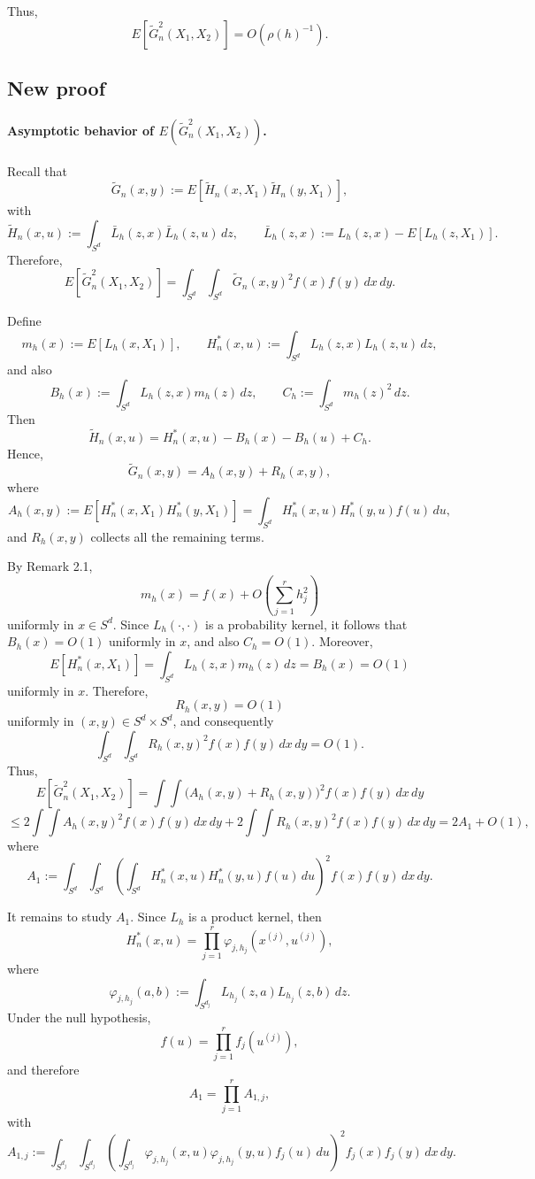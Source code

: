 \documentclass{article}
\begin{document}
Thus,
\[
E\!\left[\widetilde G_n^2(X_1,X_2)\right]=O(\rho(h)^{-1}).
\]

\subsection{New proof}

\paragraph{Asymptotic behavior of $E(\widetilde G_n^2(X_1,X_2))$.}
Recall that
\[
\widetilde G_n(x,y):=E\!\left[\widetilde H_n(x,X_1)\widetilde H_n(y,X_1)\right],
\]
with
\[
\widetilde H_n(x,u):=\int_{S^d}\bar{L}_h(z,x)\bar{L}_h(z,u)\,dz,
\qquad
\bar{L}_h(z,x):=L_h(z,x)-E[L_h(z,X_1)].
\]
Therefore,
\[
E\!\left[\widetilde G_n^2(X_1,X_2)\right]
=
\int_{S^d}\int_{S^d}\widetilde G_n(x,y)^2 f(x)f(y)\,dx\,dy.
\]

Define
\[
m_h(x):=E[L_h(x,X_1)],
\qquad
H_n^*(x,u):=\int_{S^d}L_h(z,x)L_h(z,u)\,dz,
\]
and also
\[
B_h(x):=\int_{S^d}L_h(z,x)m_h(z)\,dz,
\qquad
C_h:=\int_{S^d}m_h(z)^2\,dz.
\]
Then
\[
\widetilde H_n(x,u)=H_n^*(x,u)-B_h(x)-B_h(u)+C_h.
\]
Hence,
\[
\widetilde G_n(x,y)
=
A_h(x,y)+R_h(x,y),
\]
where
\[
A_h(x,y):=E\!\left[H_n^*(x,X_1)H_n^*(y,X_1)\right]
=
\int_{S^d}H_n^*(x,u)H_n^*(y,u)f(u)\,du,
\]
and $R_h(x,y)$ collects all the remaining terms.

By Remark 2.1,
\[
m_h(x)=f(x)+O\!\left(\sum_{j=1}^r h_j^2\right)
\]
uniformly in $x\in S^d$. Since $L_h(\cdot,\cdot)$ is a probability kernel, it follows that
$B_h(x)=O(1)$ uniformly in $x$, and also $C_h=O(1)$. Moreover,
\[
E\!\left[H_n^*(x,X_1)\right]
=
\int_{S^d}L_h(z,x)m_h(z)\,dz
=
B_h(x)
=
O(1)
\]
uniformly in $x$. Therefore,
\[
R_h(x,y)=O(1)
\]
uniformly in $(x,y)\in S^d\times S^d$, and consequently
\[
\int_{S^d}\int_{S^d}R_h(x,y)^2 f(x)f(y)\,dx\,dy=O(1).
\]
Thus,
\[
E\!\left[\widetilde G_n^2(X_1,X_2)\right]
=
\int\!\!\int \big(A_h(x,y)+R_h(x,y)\big)^2 f(x)f(y)\,dx\,dy
\]
\[
\le
2\int\!\!\int A_h(x,y)^2 f(x)f(y)\,dx\,dy
+
2\int\!\!\int R_h(x,y)^2 f(x)f(y)\,dx\,dy
=
2A_1+O(1),
\]
where
\[
A_1:=
\int_{S^d}\int_{S^d}
\left(
\int_{S^d}H_n^*(x,u)H_n^*(y,u)f(u)\,du
\right)^2
f(x)f(y)\,dx\,dy.
\]

It remains to study $A_1$. Since $L_h$ is a product kernel, then
\[
H_n^*(x,u)
=
\prod_{j=1}^r
\varphi_{j,h_j}\!\left(x^{(j)},u^{(j)}\right),
\]
where
\[
\varphi_{j,h_j}(a,b):=
\int_{S^{d_j}}L_{h_j}(z,a)L_{h_j}(z,b)\,dz.
\]
Under the null hypothesis,
\[
f(u)=\prod_{j=1}^r f_j(u^{(j)}),
\]
and therefore
\[
A_1
=
\prod_{j=1}^r A_{1,j},
\]
with
\[
A_{1,j}:=
\int_{S^{d_j}}\int_{S^{d_j}}
\left(
\int_{S^{d_j}}
\varphi_{j,h_j}(x,u)\varphi_{j,h_j}(y,u)f_j(u)\,du
\right)^2
f_j(x)f_j(y)\,dx\,dy.
\]
\end{document}

